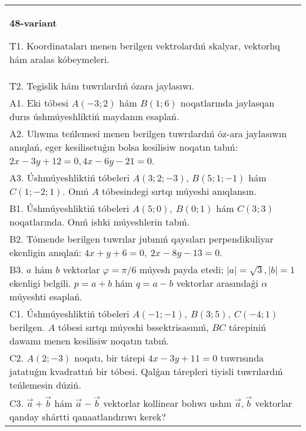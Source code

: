 \documentclass{article}
\begin{document}
\begin{tabular}{m{17cm}}
\textbf{48-variant}
\newline

T1. 
Koordinataları menen berilgen vektrolardıń skalyar, vektorlıq hám aralas kóbeymeleri. \\
T2. 
Tegislik hám tuwrılardıń ózara jaylasıwı.
 \\
A1. 
Eki tóbesi $A(-3; 2)$ hám $B(1; 6)$ noqatlarında
jaylasqan durıs úshmúyeshliktiń maydanın esaplań.
 \\
A2. 
Ulıwma teńlemesi menen berilgen tuwrılardıń      
óz-ara jaylasıwın anıqlań, eger kesilisetuǵın bolsa kesilisiw noqatın
tabıń: $2x-3y+12=0, 4x-6y-21=0$.
 \\
A3. 
Úshmúyeshliktiń tóbeleri
$A (3;2; - 3) $, $B (5;1; - 1)$ hám $C (1; - 2;1) $. Onıń $A$ tóbesindegi sırtqı múyeshi anıqlansın. 
 \\
B1. 
Úshmúyeshliktiń tóbeleri \(A(5;0),\ B(0;1)\) hám \(C(3;3)\)
noqatlarında. Onıń ishki múyeshlerin tabıń.
 \\
B2. 
Tómende berilgen tuwrılar jubınıń qaysıları
perpendikuliyar ekenligin anıqlań: $4x+y+6=0,\ 2x-8y-13=0$.
 \\
B3. 
$a$ hám $b$ vektorlar $\varphi = \pi/6$ múyesh payda etedi; $|a| = \sqrt{3},|b| = 1$ ekenligi belgili. $p = a + b$ hám $q = a - b$ vektorlar arasındaǵi $\alpha$ múyeshti esaplań.
 \\
C1. 
Úshmúyeshliktiń tóbeleri
\(A( - 1; - 1),\ B(3;5),\ C( - 4;1)\) berilgen. $A$ tóbesi sırtqı
múyeshi bssektrisasınıń, $BC$ tárepiniń dawamı menen kesilisiw
noqatın tabıń.
 \\
C2. 
\(A(2; - 3)\) noqatı, bir tárepi \(4x - 3y + 11 = 0\) 
tuwrısında jatatuǵın kvadrattıń bir tóbesi. Qalǵan tárepleri tiyisli
tuwrılardıń teńlemesin dúziń.
 \\
C3. 
\(\vec{a}+\vec{b}\) hám \(\vec{a} - \vec{b}\) vektorlar kollinear bolıwı ushın \(\vec{a},\vec{b}\) vektorlar qanday shártti qanaatlandırıwı kerek?
 \\

\end{tabular}
\vspace{1cm}
\end{document}
